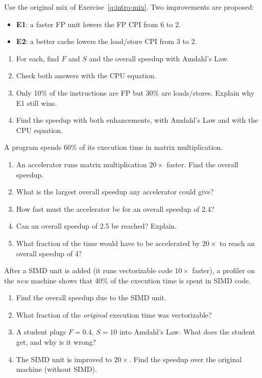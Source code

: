 \begin{exercise}\label{q:intro-choose}
Use the original mix of Exercise~\ref{q:intro-mix}. Two improvements are
proposed:
\begin{itemize}[leftmargin=*]
  \item \textbf{E1}: a faster FP unit lowers the FP CPI from 6 to 2.
  \item \textbf{E2}: a better cache lowers the load/store CPI from 3 to 2.
\end{itemize}
\begin{enumerate}[label=(\alph*),leftmargin=*]
  \item For each, find $F$ and $S$ and the overall speedup with Amdahl's Law.
  \item Check both answers with the CPU equation.
  \item Only 10\% of the instructions are FP but 30\% are loads/stores. Explain
  why E1 still wins.
  \item Find the speedup with both enhancements, with Amdahl's Law and with the
  CPU equation.
\end{enumerate}
\end{exercise}

\begin{exercise}\label{q:intro-limit}
A program spends 60\% of its execution time in matrix multiplication.
\begin{enumerate}[label=(\alph*),leftmargin=*]
  \item An accelerator runs matrix multiplication $20\times$ faster. Find the
  overall speedup.
  \item What is the largest overall speedup any accelerator could give?
  \item How fast must the accelerator be for an overall speedup of 2.4?
  \item Can an overall speedup of 2.5 be reached? Explain.
  \item What fraction of the time would have to be accelerated by $20\times$ to
  reach an overall speedup of 4?
\end{enumerate}
\end{exercise}

\begin{exercise}\label{q:intro-after}
After a SIMD unit is added (it runs vectorizable code $10\times$ faster), a
profiler on the \emph{new} machine shows that 40\% of the execution time is
spent in SIMD code.
\begin{enumerate}[label=(\alph*),leftmargin=*]
  \item Find the overall speedup due to the SIMD unit.
  \item What fraction of the \emph{original} execution time was vectorizable?
  \item A student plugs $F=0.4$, $S=10$ into Amdahl's Law. What does the
  student get, and why is it wrong?
  \item The SIMD unit is improved to $20\times$. Find the speedup over the
  original machine (without SIMD).
\end{enumerate}
\end{exercise}

